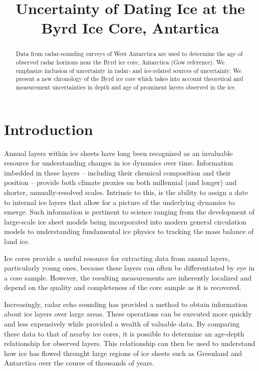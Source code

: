 \documentclass[draft,jgrga]{agutex}
\begin{document}
\title{Uncertainty of Dating Ice at the Byrd Ice Core, Antartica}

\begin{abstract}
Data from radar-sounding surveys of West Antarctica are used to
determine the age of observed radar horizons near the Byrd ice core,
Antarctica (Gow reference). We emphasize inclusion of uncertainty in
radar- and ice-related sources of uncertainty. We present a new
chronology of the Byrd ice core which takes into account theoretical
and measurement uncertainties in depth and age of prominent layers
observed in the ice.
\end{abstract}

\section{Introduction}


Annual layers within ice sheets have long been recognized as an
invaluable resource for understanding changes in ice dynamics over
time. Information imbedded in these layers -- including their chemical
composition and their position -- provide both climate proxies on both
millennial (and longer) and shorter, annually-resolved
scales. Intrinsic to this, is the ability to assign a date to internal
ice layers that allow for a picture of the underlying dynamics to
emerge. Such information is pertinent to science ranging from the 
development of
large-scale ice sheet models being incorporated into modern general
circulation models to understanding fundamental ice physics to
tracking the mass balance of land ice.

Ice cores provide a useful resource for extracting data from annual
layers, particularly young ones, because these layers can often be
differentiated by eye in a core sample. However, the resulting
measurements are inherently localized and depend on the quality and
completeness of the core sample as it is recovered. 

Increasingly, radar echo sounding has provided a method to obtain 
information about ice layers over large areas. These operations can 
be executed more
quickly and less expensively while provided a wealth of valuable
data. By comparing these data to that of nearby ice cores, it is
possible to determine an age-depth relationship for observed
layers. This relationship can then be used to understand how ice has
flowed throught large regions of ice sheets such as Greenland and
Antarctica over the course of thousands of years.
\end{document}
